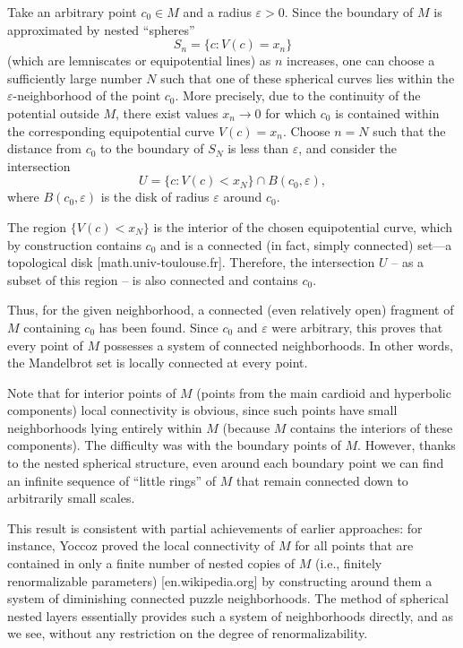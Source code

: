 \documentclass[12pt]{article}
\begin{document}
Take an arbitrary point \(c_0 \in M\) and a radius \(\varepsilon > 0\). Since the boundary of \(M\) is approximated by nested ``spheres''
\[
S_n = \{ c : V(c) = x_n \}
\]
(which are lemniscates or equipotential lines) as \(n\) increases, one can choose a sufficiently large number \(N\) such that one of these spherical curves lies within the \(\varepsilon\)-neighborhood of the point \(c_0\). More precisely, due to the continuity of the potential outside \(M\), there exist values \(x_n \to 0\) for which \(c_0\) is contained within the corresponding equipotential curve \(V(c) = x_n\). Choose \(n = N\) such that the distance from \(c_0\) to the boundary of \(S_N\) is less than \(\varepsilon\), and consider the intersection
\[
U = \{ c : V(c) < x_N \} \cap B(c_0, \varepsilon),
\]
where \(B(c_0, \varepsilon)\) is the disk of radius \(\varepsilon\) around \(c_0\).

The region \(\{ V(c) < x_N \}\) is the interior of the chosen equipotential curve, which by construction contains \(c_0\) and is a connected (in fact, simply connected) set---a topological disk [math.univ-toulouse.fr]. Therefore, the intersection \(U\) -- as a subset of this region -- is also connected and contains \(c_0\).

Thus, for the given neighborhood, a connected (even relatively open) fragment of \(M\) containing \(c_0\) has been found. Since \(c_0\) and \(\varepsilon\) were arbitrary, this proves that every point of \(M\) possesses a system of connected neighborhoods. In other words, the Mandelbrot set is locally connected at every point.

Note that for interior points of \(M\) (points from the main cardioid and hyperbolic components) local connectivity is obvious, since such points have small neighborhoods lying entirely within \(M\) (because \(M\) contains the interiors of these components). The difficulty was with the boundary points of \(M\). However, thanks to the nested spherical structure, even around each boundary point we can find an infinite sequence of ``little rings'' of \(M\) that remain connected down to arbitrarily small scales.

This result is consistent with partial achievements of earlier approaches: for instance, Yoccoz proved the local connectivity of \(M\) for all points that are contained in only a finite number of nested copies of \(M\) (i.e., finitely renormalizable parameters) [en.wikipedia.org] by constructing around them a system of diminishing connected puzzle neighborhoods. The method of spherical nested layers essentially provides such a system of neighborhoods directly, and as we see, without any restriction on the degree of renormalizability.
\end{document}
